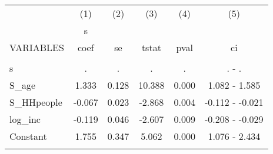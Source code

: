 \documentclass[]{article}
\begin{document}
\begin{tabular}{lccccc} \hline
 & (1) & (2) & (3) & (4) & (5) \\
 & s &  &  &  &  \\
VARIABLES & coef & se & tstat & pval & ci \\ \hline
 &  &  &  &  &  \\
s & . & . & . & . & . - . \\
S\_age & 1.333 & 0.128 & 10.388 & 0.000 & 1.082 - 1.585 \\
S\_HHpeople & -0.067 & 0.023 & -2.868 & 0.004 & -0.112 - -0.021 \\
log\_inc & -0.119 & 0.046 & -2.607 & 0.009 & -0.208 - -0.029 \\
Constant & 1.755 & 0.347 & 5.062 & 0.000 & 1.076 - 2.434 \\
 &  &  &  &  &  \\ \hline
\end{tabular}
\end{document}
